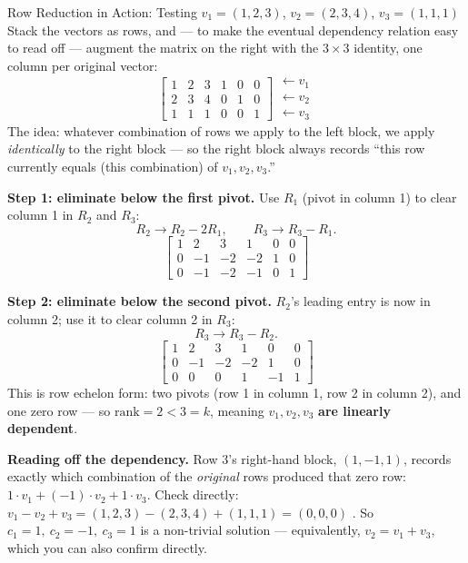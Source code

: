 \begin{exbox}{Row Reduction in Action: Testing $v_1=(1,2,3)$, $v_2=(2,3,4)$, $v_3=(1,1,1)$}
Stack the vectors as rows, and --- to make the eventual dependency relation easy to read off --- augment the matrix on the right with the $3\times 3$ identity, one column per original vector:
$$
\left[\begin{array}{ccc|ccc}
1 & 2 & 3 & 1 & 0 & 0 \\
2 & 3 & 4 & 0 & 1 & 0 \\
1 & 1 & 1 & 0 & 0 & 1
\end{array}\right]
\begin{array}{l} \leftarrow v_1 \\ \leftarrow v_2 \\ \leftarrow v_3 \end{array}
$$
The idea: whatever combination of rows we apply to the left block, we apply \emph{identically} to the right block --- so the right block always records ``this row currently equals (this combination) of $v_1,v_2,v_3$.''

\textbf{Step 1: eliminate below the first pivot.} Use $R_1$ (pivot in column 1) to clear column 1 in $R_2$ and $R_3$:
$$
R_2 \to R_2 - 2R_1, \qquad R_3 \to R_3 - R_1.
$$
$$
\left[\begin{array}{ccc|ccc}
1 & 2 & 3 & 1 & 0 & 0 \\
0 & -1 & -2 & -2 & 1 & 0 \\
0 & -1 & -2 & -1 & 0 & 1
\end{array}\right]
$$

\textbf{Step 2: eliminate below the second pivot.} $R_2$'s leading entry is now in column 2; use it to clear column 2 in $R_3$:
$$
R_3 \to R_3 - R_2.
$$
$$
\left[\begin{array}{ccc|ccc}
1 & 2 & 3 & 1 & 0 & 0 \\
0 & -1 & -2 & -2 & 1 & 0 \\
0 & 0 & 0 & 1 & -1 & 1
\end{array}\right]
$$
This is row echelon form: two pivots (row 1 in column 1, row 2 in column 2), and one zero row --- so $\mathrm{rank}=2 < 3 = k$, meaning $v_1,v_2,v_3$ \textbf{are linearly dependent}.

\textbf{Reading off the dependency.} Row 3's right-hand block, $(1,-1,1)$, records exactly which combination of the \emph{original} rows produced that zero row: $1\cdot v_1 + (-1)\cdot v_2 + 1\cdot v_3$. Check directly: $v_1 - v_2 + v_3 = (1,2,3)-(2,3,4)+(1,1,1) = (0,0,0)$ \checkmark. So $c_1=1,\ c_2=-1,\ c_3=1$ is a non-trivial solution --- equivalently, $v_2 = v_1+v_3$, which you can also confirm directly.
\end{exbox}

